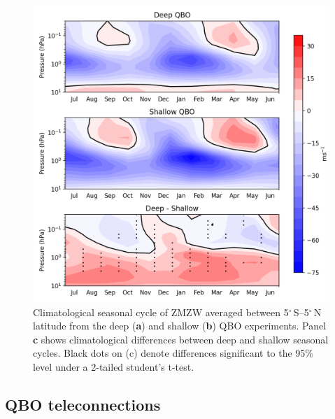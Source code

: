 \begin{figure}[h!]
\begin{center}
\noindent\includegraphics[width = 0.7\linewidth]{Figures/Figures-deepQBO/SAO_seasonal_cycles.png}
\caption[Climatological seasonal cycle of equatorial ZMZW in QBO experiments]{Climatological seasonal cycle of ZMZW averaged between 5$^{\circ}$\,S--5$^{\circ}$\,N latitude from the deep (\textbf{a}) and shallow (\textbf{b}) QBO experiments. Panel \textbf{c} shows climatological differences between deep and shallow seasonal cycles. Black dots on (c) denote differences significant to the 95\% level under a 2-tailed student's t-test.}
\label{fig:experiment_SAOs}
\end{center}
\end{figure}


\subsection{QBO teleconnections}


